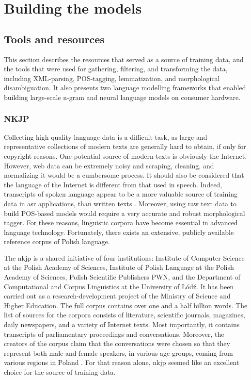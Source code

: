 \chapter{Building the models}
\label{chapter:tools}
\section{Tools and resources}
This section describes the resources that served as a source of training data, and the tools that were used for gathering, filtering, and transforming the data, including XML-parsing, POS-tagging, lemmatization, and morphological disambiguation. It also presents two language modelling frameworks that enabled building large-scale n-gram and neural language models on consumer hardware.
\subsection{NKJP}
\label{section:nkjp}
Collecting high quality language data is a difficult task, as large and representative collections of modern texts are generally hard to obtain, if only for copyright reasons. One potential source of modern texts is obviously the Internet. However, web data can be extremely noisy and scraping, cleaning, and normalizing it would be a cumbersome process. It should also be considered that the language of the Internet is different from that used in speech. Indeed, transcripts of spoken language appear to be a more valuable source of training data in \gls{asr} applications, than written texts \cite{dziadzio2015comparison}. Moreover, using raw text data to build POS-based models would require a very accurate and robust morphological tagger. For these reasons, linguistic corpora have become essential in advanced language technology. Fortunately, there exists an extensive, publicly available reference corpus of Polish language.

The \gls{nkjp} is a shared initiative of four institutions: Institute of Computer Science at the Polish Academy of Sciences, Institute of Polish Language at the Polish Academy of Sciences, Polish Scientific Publishers PWN, and the Department of Computational and Corpus Linguistics at the University of Łódź. It has been carried out as a research-development project of the Ministry of Science and Higher Education. The full corpus contains over one and a half billion words. The list of sources for the corpora consists of literature, scientific journals, magazines, daily newspapers, and a variety of Internet texts. Most importantly, it contains transcripts of parliamentary proceedings and conversations. Moreover, the creators of the corpus claim that the conversations were chosen so that they represent both male and female speakers, in various age groups, coming from various regions in Poland \cite{lewandowska2012narodowy}. For that reason alone, \gls{nkjp} seemed like an excellent choice for the source of training data.

